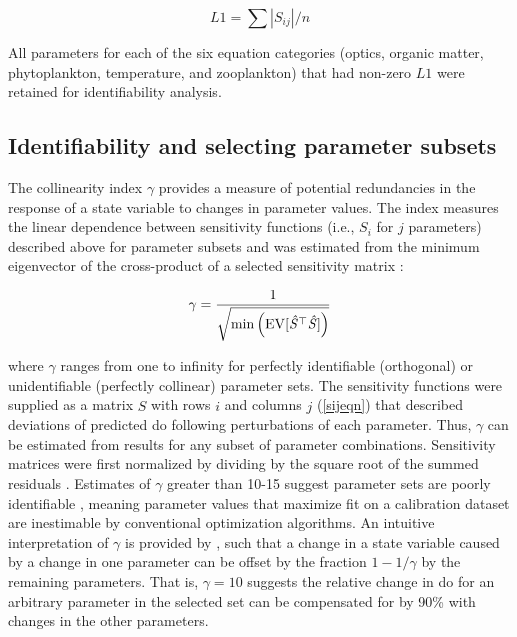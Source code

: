 \documentclass[review]{elsarticle}\usepackage[]{graphicx}\usepackage[]{color}
\begin{document}
\begin{equation} \label{l1}
L1 = \sum|S_{ij}|/n
\end{equation}

All parameters for each of the six equation categories (optics, organic matter, phytoplankton, temperature, and zooplankton) that had non-zero $L1$ were retained for identifiability analysis.  

\subsection{Identifiability and selecting parameter subsets}

The collinearity index $\gamma$ provides a measure of potential redundancies in the response of a state variable to changes in parameter values.  The index measures the linear dependence between sensitivity functions (i.e., $S_i$ for $j$ parameters) described above for parameter subsets and was estimated from the minimum eigenvector of the cross-product of a selected sensitivity matrix \citep{Brun01,Omlin01}:

\begin{equation} \label{gameq}
\gamma = \frac{1} {\sqrt{ \min \left(\rm{EV}[\mathit{\hat{S}}^\top \mathit{\hat{S}}]\right)}}
\end{equation}

\noindent where $\gamma$ ranges from one to infinity for perfectly identifiable (orthogonal) or unidentifiable (perfectly collinear) parameter sets.  The sensitivity functions were supplied as a matrix $\hat{S}$ with rows $i$ and columns $j$ (\cref{sijeqn}) that described deviations of predicted \ac{do} following perturbations of each parameter.  Thus, $\gamma$ can be estimated from results for any subset of parameter combinations. Sensitivity matrices were first normalized by dividing by the square root of the summed residuals \citep{Omlin01,Soetaert10}. Estimates of $\gamma$ greater than 10-15 suggest parameter sets are poorly identifiable \citep{Brun01,Omlin01}, meaning parameter values that maximize fit on a calibration dataset are inestimable by conventional optimization algorithms. An intuitive interpretation of $\gamma$ is provided by \citet{Brun01}, such that a change in a state variable caused by a change in one parameter can be offset by the fraction $1 - 1/\gamma$ by the remaining parameters.  That is, $\gamma = 10$ suggests the relative change in \ac{do} for an arbitrary parameter in the selected set can be compensated for by 90\% with changes in the other parameters. 
\end{document}
